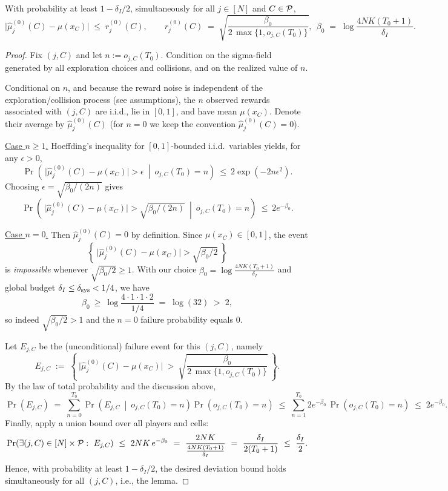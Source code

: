 \begin{lemma}
With probability at least $1-\delta_{I}/2$, simultaneously for all $j\in[N]$ and $C\in \mathcal{P}$,
\[
\big|\widehat{\mu}_j^{(0)}(C) - \mu(x_C)\big| \;\le\; r^{(0)}_{j}(C),
\qquad
r^{(0)}_{j}(C) \;=\; \sqrt{\frac{\beta_0}{2\,\max\{1,o_{j,C}(T_0)\}}},\ \ 
\beta_0 \;=\; \log\!\frac{4 N K (T_0+1)}{\delta_{I}} .
\]
\end{lemma}

\begin{proof}
Fix $(j,C)$ and let $n:=o_{j,C}(T_0)$. Condition on the sigma-field generated by all exploration choices and collisions, and on the realized value of $n$. 

Conditional on $n$, and because the reward noise is independent of the exploration/collision process (see assumptions), the $n$ observed rewards associated with $(j,C)$ are i.i.d., lie in $[0,1]$, and have mean $\mu(x_C)$. Denote their average by $\widehat\mu^{(0)}_j(C)$ (for $n=0$ we keep the convention $\widehat\mu^{(0)}_j(C)=0$).

\underline{Case $n\ge 1$.} Hoeffding's inequality for $[0,1]$-bounded i.i.d.\ variables yields, for any $\epsilon>0$,
\[
\Pr\!\left(\,\big|\widehat\mu^{(0)}_j(C)-\mu(x_C)\big|>\epsilon \ \middle|\ o_{j,C}(T_0)=n\right)\ \le\ 2\exp\!\left(-2 n \epsilon^2\right).
\]
Choosing $\epsilon=\sqrt{\beta_0/(2n)}$ gives
\begin{equation}
\label{eq:cond-failure}
\Pr\!\left(\,\big|\widehat\mu^{(0)}_j(C)-\mu(x_C)\big|>\sqrt{\beta_0/(2n)} \ \middle|\ o_{j,C}(T_0)=n\right)\ \le\ 2 e^{-\beta_0}.
\end{equation}

\underline{Case $n=0$.} Then $\widehat\mu^{(0)}_j(C)=0$ by definition. Since $\mu(x_C)\in[0,1]$, the event
\[
\left\{\ \big|\widehat\mu^{(0)}_j(C)-\mu(x_C)\big|>\sqrt{\beta_0/2}\ \right\}
\]
is \emph{impossible} whenever $\sqrt{\beta_0/2}\ge 1$. With our choice $\beta_0=\log\!\frac{4NK(T_0+1)}{\delta_I}$ and global budget $\delta_I\le \delta_{\rm sys}<1/4$, we have
\[
\beta_0 \ \ge\ \log\!\frac{4\cdot 1\cdot 1\cdot 2}{1/4} \;=\; \log(32) \;>\; 2,
\]
so indeed $\sqrt{\beta_0/2}>1$ and the $n=0$ failure probability equals $0$.

Let $E_{j,C}$ be the (unconditional) failure event for this $(j,C)$, namely
\[
E_{j,C} \;:=\; \left\{\ \big|\widehat{\mu}_j^{(0)}(C)-\mu(x_C)\big|\ >\ \sqrt{\frac{\beta_0}{2\,\max\{1,o_{j,C}(T_0)\}}}\ \right\}.
\]
By the law of total probability and the discussion above,
\[
\Pr(E_{j,C})
\;=\; \sum_{n=0}^{T_0} \Pr\!\left(E_{j,C}\ \middle|\ o_{j,C}(T_0)=n\right)\Pr\!\left(o_{j,C}(T_0)=n\right)
\;\le\; \sum_{n=1}^{T_0} 2 e^{-\beta_0}\,\Pr\!\left(o_{j,C}(T_0)=n\right)
\;\le\; 2 e^{-\beta_0}.
\]
Finally, apply a union bound over all players and cells:
\[
\Pr\!\left(\exists (j,C)\in[N]\times\Pcal:\ E_{j,C}\right)
\ \le\ 2 N K\, e^{-\beta_0}
\ =\ \frac{2 N K}{\frac{4 N K (T_0+1)}{\delta_I}}
\ =\ \frac{\delta_I}{2(T_0+1)}
\ \le\ \frac{\delta_I}{2}.
\]
Hence, with probability at least $1-\delta_I/2$, the desired deviation bound holds simultaneously for all $(j,C)$, i.e., the lemma.
\end{proof}





